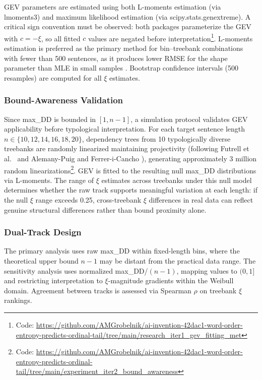 \documentclass[11pt,letterpaper]{article}
\begin{document}
GEV parameters are estimated using both L-moments estimation (via lmoments3) \cite{Hosking1990} and maximum likelihood estimation (via scipy.stats.genextreme). A critical sign convention must be observed: both packages parameterize the GEV with $c = -\xi$, so all fitted $c$ values are negated before interpretation\footnote{Code: \url{https://github.com/AMGrobelnik/ai-invention-42dac1-word-order-entropy-predicts-ordinal-tail/tree/main/research_iter1_gev_fitting_met}}. L-moments estimation is preferred as the primary method for bin--treebank combinations with fewer than 500 sentences, as it produces lower RMSE for the shape parameter than MLE in small samples \cite{Hosking1990}. Bootstrap confidence intervals (500 resamples) are computed for all $\xi$ estimates.

\subsubsection{Bound-Awareness Validation}

Since max\_DD is bounded in $[1, n{-}1]$, a simulation protocol validates GEV applicability before typological interpretation. For each target sentence length $n \in \{10, 12, 14, 16, 18, 20\}$, dependency trees from 10 typologically diverse treebanks are randomly linearized maintaining projectivity (following Futrell et al.\ \cite{Futrell2015} and Alemany-Puig and Ferrer-i-Cancho \cite{AlemanyPuig2022}), generating approximately 3 million random linearizations\footnote{Code: \url{https://github.com/AMGrobelnik/ai-invention-42dac1-word-order-entropy-predicts-ordinal-tail/tree/main/experiment_iter2_bound_awareness}}. GEV is fitted to the resulting null max\_DD distributions via L-moments. The range of $\xi$ estimates across treebanks under this null model determines whether the raw track supports meaningful variation at each length: if the null $\xi$ range exceeds 0.25, cross-treebank $\xi$ differences in real data can reflect genuine structural differences rather than bound proximity alone.

\subsubsection{Dual-Track Design}

The primary analysis uses raw max\_DD within fixed-length bins, where the theoretical upper bound $n{-}1$ may be distant from the practical data range. The sensitivity analysis uses normalized max\_DD/$(n{-}1)$, mapping values to $(0, 1]$ and restricting interpretation to $\xi$-magnitude gradients within the Weibull domain. Agreement between tracks is assessed via Spearman $\rho$ on treebank $\xi$ rankings.
\end{document}

